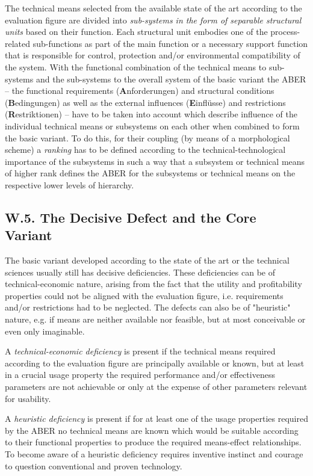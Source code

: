 \documentclass[11pt,a4paper]{article}
\begin{document}
The technical means selected from the available state of the art according to
the evaluation figure are divided into \emph{sub-systems in the form of
  separable structural units} based on their function.  Each structural unit
embodies one of the process-related sub-functions as part of the main function
or a necessary support function that is responsible for control, protection
and/or environmental compatibility of the system. With the functional
combination of the technical means to sub-systems and the sub-systems to the
overall system of the basic variant the ABER -- the functional requirements
(\textbf{A}nforderungen) and structural conditions (\textbf{B}edingungen) as
well as the external influences (\textbf{E}infl\"usse) and restrictions
(\textbf{R}estriktionen) -- have to be taken into account which describe
influence of the individual technical means or subsystems on each other when
combined to form the basic variant. To do this, for their coupling (by means
of a morphological scheme) a \emph{ranking} has to be defined according to the
technical-technological importance of the subsystems in such a way that a
subsystem or technical means of higher rank defines the ABER for the
subsystems or technical means on the respective lower levels of hierarchy.

\subsection*{W.5. The Decisive Defect and the Core Variant}

The basic variant developed according to the state of the art or the technical
sciences usually still has decisive deficiencies. These deficiencies can be of
technical-economic nature, arising from the fact that the utility and
profitability properties could not be aligned with the evaluation figure, i.e.
requirements and/or restrictions had to be neglected. The defects can also be
of "heuristic" nature, e.g. if means are neither available nor feasible, but
at most conceivable or even only imaginable.

A \emph{technical-economic deficiency} is present if the technical means
required according to the evaluation figure are principally available or known,
but at least in a crucial usage property the required performance and/or
effectiveness parameters are not achievable or only at the expense of other
parameters relevant for usability.

A \emph{heuristic deficiency} is present if for at least one of the usage
properties required by the ABER no technical means are known which would be
suitable according to their functional properties to produce the required
means-effect relationships. To become aware of a heuristic deficiency requires
inventive instinct and courage to question conventional and proven technology.
\end{document}
